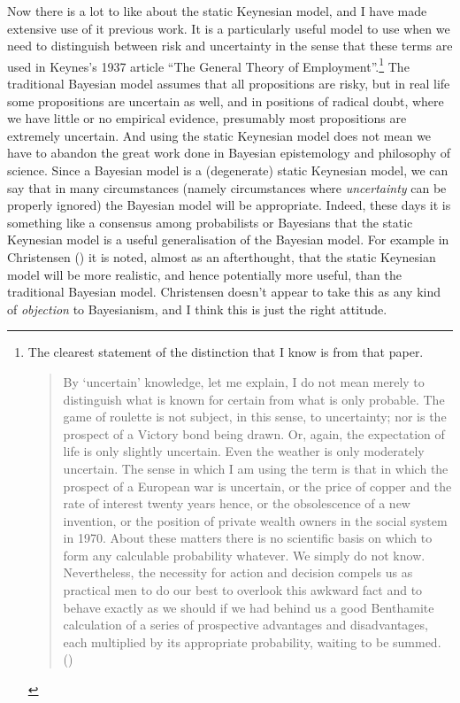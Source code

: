 \documentclass[
  10pt,
  letterpaper,
  DIV=11,
  numbers=noendperiod,
  twoside]{scrartcl}
\begin{document}
Now there is a lot to like about the static Keynesian model, and I have
made extensive use of it previous work. It is a particularly useful
model to use when we need to distinguish between risk and uncertainty in
the sense that these terms are used in Keynes's 1937 article ``The
General Theory of Employment''.\footnote{The clearest statement of the
  distinction that I know is from that paper.

  \begin{quote}
  By `uncertain' knowledge, let me explain, I do not mean merely to
  distinguish what is known for certain from what is only probable. The
  game of roulette is not subject, in this sense, to uncertainty; nor is
  the prospect of a Victory bond being drawn. Or, again, the expectation
  of life is only slightly uncertain. Even the weather is only
  moderately uncertain. The sense in which I am using the term is that
  in which the prospect of a European war is uncertain, or the price of
  copper and the rate of interest twenty years hence, or the
  obsolescence of a new invention, or the position of private wealth
  owners in the social system in 1970. About these matters there is no
  scientific basis on which to form any calculable probability whatever.
  We simply do not know. Nevertheless, the necessity for action and
  decision compels us as practical men to do our best to overlook this
  awkward fact and to behave exactly as we should if we had behind us a
  good Benthamite calculation of a series of prospective advantages and
  disadvantages, each multiplied by its appropriate probability, waiting
  to be summed. ()
  \end{quote}} The traditional Bayesian model assumes that all
propositions are risky, but in real life some propositions are uncertain
as well, and in positions of radical doubt, where we have little or no
empirical evidence, presumably most propositions are extremely
uncertain. And using the static Keynesian model does not mean we have to
abandon the great work done in Bayesian epistemology and philosophy of
science. Since a Bayesian model is a (degenerate) static Keynesian
model, we can say that in many circumstances (namely circumstances where
\emph{uncertainty} can be properly ignored) the Bayesian model will be
appropriate. Indeed, these days it is something like a consensus among
probabilists or Bayesians that the static Keynesian model is a useful
generalisation of the Bayesian model. For example in Christensen
() it is noted, almost as an
afterthought, that the static Keynesian model will be more realistic,
and hence potentially more useful, than the traditional Bayesian model.
Christensen doesn't appear to take this as any kind of \emph{objection}
to Bayesianism, and I think this is just the right attitude.
\end{document}
